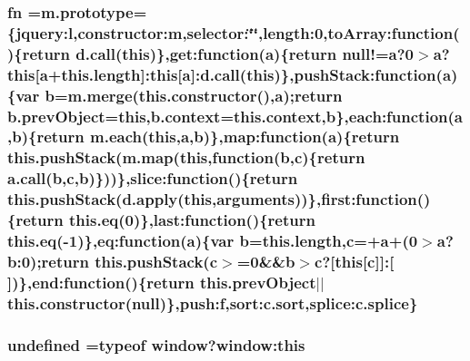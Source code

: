 \hypertarget{root_2static_2root_2js_2jquery-1_811_81_8min_8js_ab2836ee14921cbd6e34ea91a9a99ad66}{
\subsubsection[{fn}]{ fn ={\bf m.\-prototype}=\{jquery\-:l,constructor\-:m,selector\-:\char`\"{}\char`\"{},length\-:0,to\-Array\-:function()\{return {\bf d.\-call}(this)\},get\-:function({\bf a})\{return null!={\bf a}?0$>${\bf a}?this\mbox{[}{\bf a}+this.\-length\mbox{]}\-:this\mbox{[}{\bf a}\mbox{]}\-:{\bf d.\-call}(this)\},push\-Stack\-:function({\bf a})\{var {\bf b}=m.\-merge(this.\-constructor(),{\bf a});return b.\-prev\-Object=this,b.\-context=this.\-context,{\bf b}\},each\-:function({\bf a},{\bf b})\{return {\bf m.\-each}(this,{\bf a},{\bf b})\},map\-:function({\bf a})\{return this.\-push\-Stack(m.\-map(this,function({\bf b},{\bf c})\{return {\bf a.\-call}({\bf b},{\bf c},{\bf b})\}))\},slice\-:function()\{return this.\-push\-Stack(d.\-apply(this,arguments))\},first\-:function()\{return this.\-eq(0)\},last\-:function()\{return this.\-eq(-\/1)\},eq\-:function({\bf a})\{var {\bf b}=this.\-length,{\bf c}=+{\bf a}+(0$>${\bf a}?b\-:0);return this.\-push\-Stack({\bf c}$>$=0\&\&{\bf b}$>${\bf c}?\mbox{[}this\mbox{[}{\bf c}\mbox{]}\mbox{]}\-:\mbox{[}$\,$\mbox{]})\},end\-:function()\{return this.\-prev\-Object$\vert$$\vert$this.\-constructor(null)\},push\-:f,sort\-:c.\-sort,splice\-:c.\-splice\}}}\label{root_2static_2root_2js_2jquery-1_811_81_8min_8js_ab2836ee14921cbd6e34ea91a9a99ad66}
\hypertarget{root_2static_2root_2js_2jquery-1_811_81_8min_8js_ae21cc36bf0d65014c717a481a3f8a468}{
\subsubsection[{undefined}]{\setlength{\rightskip}{0pt plus 5cm}undefined =typeof {\bf window}?window\-:this}}\label{root_2static_2root_2js_2jquery-1_811_81_8min_8js_ae21cc36bf0d65014c717a481a3f8a468}
